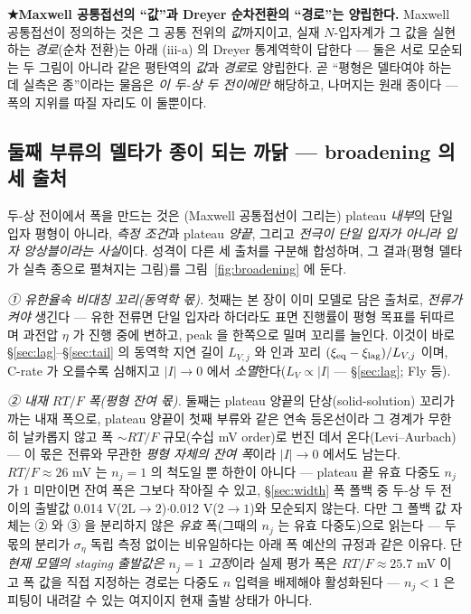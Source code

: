 \textbf{★Maxwell 공통접선의 ``값''과 Dreyer 순차전환의 ``경로''는 양립한다.} Maxwell 공통접선이 정의하는 것은
그 공통 전위의 \emph{값}까지이고, 실재 $N$-입자계가 그 값을 실현하는 \emph{경로}(순차 전환)는 아래 (iii-a) 의
Dreyer 통계역학이 답한다 --- 둘은 서로 모순되는 두 그림이 아니라 같은 평탄역의 \emph{값}과 \emph{경로}로
양립한다. 곧 ``평형은 델타여야 하는데 실측은 종''이라는 물음은 \emph{이 두-상 두 전이에만} 해당하고,
나머지는 원래 종이다 --- 폭의 지위를 따질 자리도 이 둘뿐이다.

\subsection{둘째 부류의 델타가 종이 되는 까닭 --- broadening 의 세 출처}\label{sec:broadening-sources}
두-상 전이에서 폭을 만드는 것은 (Maxwell
공통접선이 그리는) plateau \emph{내부}의 단일 입자 평형이 아니라, \emph{측정 조건}과 plateau \emph{양끝}, 그리고
\emph{전극이 단일 입자가 아니라 입자 앙상블이라는 사실}이다. 성격이 다른 세 출처를 구분해 합성하며, 그 결과(평형 델타가
실측 종으로 펼쳐지는 그림)를 그림~\ref{fig:broadening} 에 둔다.

\emph{① 유한율속 비대칭 꼬리(동역학 몫).} 첫째는 본 장이 이미 모델로 담은 출처로, \emph{전류가 켜야} 생긴다 --- 유한
전류면 단일 입자라 하더라도 표면 진행률이 평형 목표를 뒤따르며 과전압 $\eta$ 가 진행 중에 변하고, peak 을 한쪽으로
밀며 꼬리를 늘인다. 이것이 바로 \S\ref{sec:lag}--\S\ref{sec:tail} 의 동역학 지연 길이 $L_{V,j}$ 와 인과 꼬리
$(\xi_{\mathrm{eq}}-\xi_\mathrm{lag})/L_{V,j}$ 이며, C-rate 가 오를수록 심해지고 $|I|\!\to\!0$ 에서
\emph{소멸}한다($L_V\propto|I|$ --- \S\ref{sec:lag}; Fly 등\cite{fly2020}).

\emph{② 내재 $RT/F$ 폭(평형 잔여 몫).} 둘째는 plateau 양끝의 단상(solid-solution) 꼬리가 까는 내재 폭으로, plateau
양끝이 첫째 부류와 같은 연속 등온선이라 그 경계가 무한히 날카롭지 않고 폭 $\sim RT/F$ 규모(수십 mV order)로 번진 데서
온다(Levi--Aurbach\cite{leviaurbach1999}) --- 이 몫은 전류와 무관한 \emph{평형 자체의 잔여 폭}이라 $|I|\!\to\!0$ 에서도
남는다. $RT/F\!\approx\!26$ mV 는 $n_j{=}1$ 의 척도일 뿐 하한이 아니다 --- plateau 끝 유효 다중도 $n_j$ 가
$1$ 미만이면 잔여 폭은 그보다 작아질 수 있고, \S\ref{sec:width} 폭 폴백 중 두-상 두 전이의 출발값
0.014 V($2\mathrm L\!\to\!2$)$\cdot$0.012 V($2\!\to\!1$)와 모순되지 않는다. 다만 그 폴백 값 자체는 ② 와
③ 을 분리하지 않은 \emph{유효} 폭(그때의 $n_j$ 는 유효 다중도)으로 읽는다 --- 두 몫의 분리가
$\sigma_\eta$ 독립 측정 없이는 비유일하다는 아래 폭 예산의 규정과 같은 이유다. 단 \emph{현재 모델의 staging
출발값은 $n_j{=}1$ 고정}이라 실제 평가 폭은 $RT/F\!\approx\!25.7$ mV 이고 폭 값을 직접 지정하는 경로는 다중도
$n$ 입력을 배제해야 활성화된다 --- $n_j\!<\!1$ 은 피팅이 내려갈 수 있는 여지이지 현재 출발 상태가 아니다.

